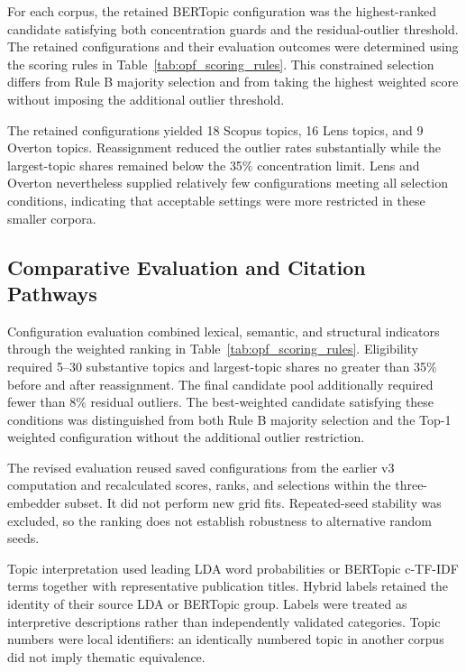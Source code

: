 \documentclass[a4paper,fleqn]{cas-sc}
\begin{document}
For each corpus, the retained BERTopic configuration was the highest-ranked candidate satisfying both concentration guards and the residual-outlier threshold. The retained configurations and their evaluation outcomes were determined using the scoring rules in Table~\ref{tab:opf_scoring_rules}. This constrained selection differs from Rule B majority selection and from taking the highest weighted score without imposing the additional outlier threshold.


The retained configurations yielded 18 Scopus topics, 16 Lens topics, and 9 Overton topics. Reassignment reduced the outlier rates substantially while the largest-topic shares remained below the 35\% concentration limit. Lens and Overton nevertheless supplied relatively few configurations meeting all selection conditions, indicating that acceptable settings were more restricted in these smaller corpora.

\subsection{Comparative Evaluation and Citation Pathways}\label{sec:topic_interpretation}

Configuration evaluation combined lexical, semantic, and structural indicators through the weighted ranking in Table~\ref{tab:opf_scoring_rules}. Eligibility required 5--30 substantive topics and largest-topic shares no greater than 35\% before and after reassignment. The final candidate pool additionally required fewer than 8\% residual outliers. The best-weighted candidate satisfying these conditions was distinguished from both Rule B majority selection and the Top-1 weighted configuration without the additional outlier restriction.

The revised evaluation reused saved configurations from the earlier v3 computation and recalculated scores, ranks, and selections within the three-embedder subset. It did not perform new grid fits. Repeated-seed stability was excluded, so the ranking does not establish robustness to alternative random seeds.

Topic interpretation used leading LDA word probabilities or BERTopic c-TF-IDF terms together with representative publication titles. Hybrid labels retained the identity of their source LDA or BERTopic group. Labels were treated as interpretive descriptions rather than independently validated categories. Topic numbers were local identifiers: an identically numbered topic in another corpus did not imply thematic equivalence.
\end{document}

